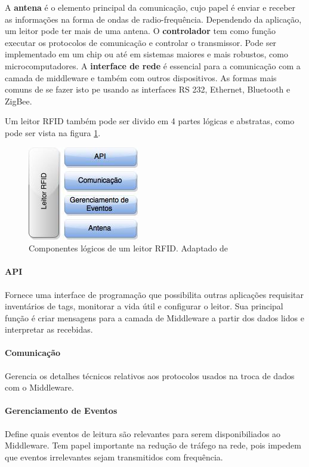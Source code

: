 	A \textbf{antena} é o elemento principal da comunicação, cujo papel é enviar e receber as informações na forma de ondas de radio-frequência. Dependendo da aplicação, um leitor pode ter mais de uma antena. O \textbf{controlador} tem como função executar os protocolos de comunicação e controlar o transmissor. Pode ser implementado em um chip ou até em sistemas maiores e mais robustos, como microcomputadores. A \textbf{interface de rede} é essencial para a comunicação com a camada de middleware e também com outros dispositivos. As formas mais comuns de se fazer isto pe usando as interfaces RS 232, Ethernet, Bluetooth e ZigBee.
	
	Um leitor RFID também pode ser divido em 4 partes lógicas e abstratas, como pode ser vista na figura \ref{fig:reader}. 
		
		\begin{figure}[h!]
			\centering
			\includegraphics[width=0.25\linewidth]{reader}
			\caption{Componentes lógicos de um leitor RFID. Adaptado de \cite{rfidbook}}
			\label{fig:reader}
		\end{figure}
	
	\paragraph{API} Fornece uma interface de programação que possibilita outras aplicações requisitar inventários de tags, monitorar a vida útil e configurar o leitor. Sua principal função é criar mensagens para a camada de Middleware a partir dos dados lidos e interpretar as recebidas.
	
	\paragraph{Comunicação} Gerencia os detalhes técnicos relativos aos protocolos usados na troca de dados com o Middleware.
	
	\paragraph{Gerenciamento de Eventos} Define quais eventos de leitura são relevantes para serem disponibiliados ao Middleware. Tem papel importante na redução de tráfego na rede, pois impedem que eventos irrelevantes sejam transmitidos com frequência.
	
